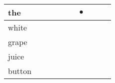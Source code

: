 \documentclass[landscape]{article}
\newcommand{\ssp}{\hspace{2pt}}
\newcommand{\mex}{\cellcolor{g}$\bullet$}
\begin{document}
\begin{tabular}{|l|p{10pt}|p{10pt}|p{10pt}|p{10pt}|p{10pt}|p{10pt}|p{10pt}|p{10pt}|p{10pt}|}
\hline
\ssp \cellcolor{ref5}the \ssp&\hspace{2pt}&\hspace{2pt}&\hspace{2pt}&\hspace{2pt}&\hspace{2pt}&\hspace{2pt}\mex&\hspace{2pt}&\hspace{2pt}&\hspace{2pt}\\
\hline
\ssp white \ssp&\hspace{2pt}&\hspace{2pt}&\hspace{2pt}&\hspace{2pt}&\hspace{2pt}&\hspace{2pt}&\hspace{2pt}&\hspace{2pt}&\hspace{2pt}\\
\hline
\ssp grape \ssp&\hspace{2pt}&\hspace{2pt}&\hspace{2pt}&\hspace{2pt}&\hspace{2pt}&\hspace{2pt}&\hspace{2pt}&\hspace{2pt}&\hspace{2pt}\\
\hline
\ssp juice \ssp&\hspace{2pt}&\hspace{2pt}&\hspace{2pt}&\hspace{2pt}&\hspace{2pt}&\hspace{2pt}&\hspace{2pt}&\hspace{2pt}&\hspace{2pt}\\
\hline
\ssp button \ssp&\hspace{2pt}&\hspace{2pt}&\hspace{2pt}&\hspace{2pt}&\hspace{2pt}&\hspace{2pt}&\hspace{2pt}&\hspace{2pt}&\hspace{2pt}\\

\end{tabular}
\end{document}
